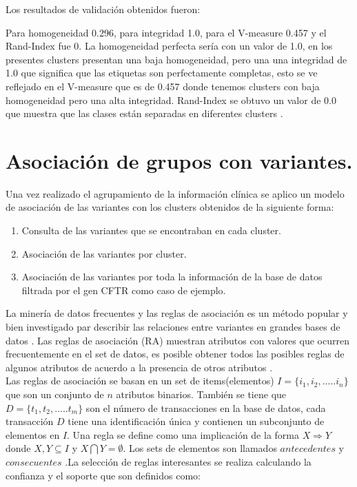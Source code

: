 Los resultados de validación obtenidos fueron:

Para homogeneidad 0.296, para integridad 1.0, para el V-measure 0.457 y el Rand-Index fue 0. La homogeneidad perfecta sería con un valor de 1.0, en los presentes clusters presentan una baja homogeneidad, pero una una integridad de 1.0 que significa que las etiquetas son perfectamente completas, esto se ve reflejado en el V-measure que es de 0.457 donde tenemos clusters con baja homogeneidad pero una alta integridad.  Rand-Index se obtuvo un valor de 0.0 que muestra que las clases están separadas en diferentes clusters \cite{scikit-learn}. 

\section{Asociación de grupos con variantes.}

Una vez realizado el agrupamiento de la información clínica se aplico un modelo de asociación de las variantes con los clusters obtenidos de la siguiente forma:

\begin{enumerate}
	\item Consulta de las variantes que se encontraban en cada cluster.
	\item Asociación de las variantes por cluster.
	\item Asociación de las variantes por toda la información de la base de datos filtrada por el gen CFTR como caso de ejemplo.
\end{enumerate}

La minería de datos frecuentes y las reglas de asociación  es un método popular y bien investigado par describir las relaciones entre variantes en grandes bases de datos \cite{Hahsler2005}. Las reglas de asociación (RA) muestran atributos con valores que ocurren frecuentemente en el set de datos, es posible obtener todos las posibles reglas de algunos atributos de acuerdo a la presencia de otros atributos \cite{Karabatak2009}.\\

Las reglas de asociación se basan en un set de items(elementos) $I = \{i_1,i_2,.....i_n \}$ que son un conjunto de $n$ atributos binarios. También se tiene que $D = \{t_1,t_2,..... t_m\}$ son el número de transacciones en la base de datos, cada transacción $D$ tiene una identificación única y contienen un subconjunto de elementos en $I$. Una regla se define como una implicación de la forma $X \Rightarrow Y$ donde $X,Y \subseteq I$ y $X \bigcap Y = \emptyset$. Los sets de elementos son llamados $antecedentes$ y $consecuentes$ \cite{Hahsler2005,Karabatak2009}.La selección de reglas interesantes se realiza calculando la confianza y el soporte que son definidos como:

